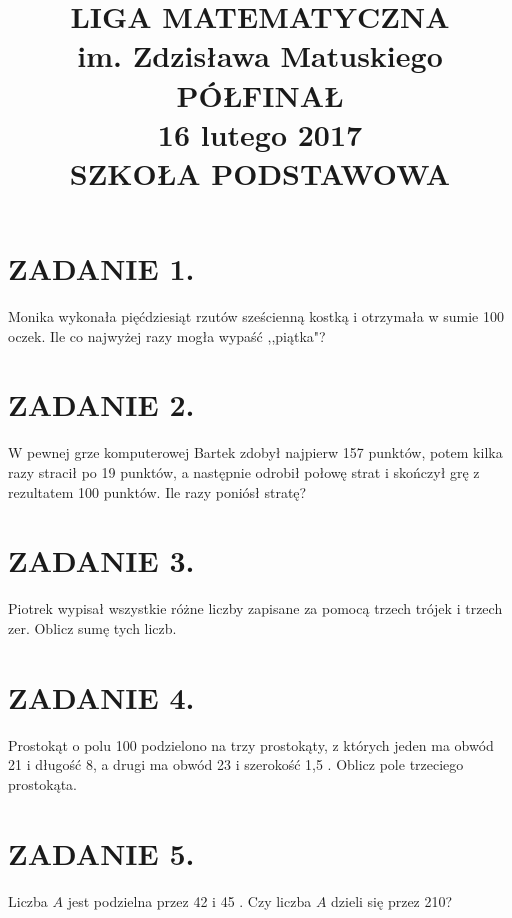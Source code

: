 \documentclass[10pt]{article}
\title{LIGA MATEMATYCZNA \\
 im. Zdzisława Matuskiego \\
 PÓŁFINAŁ \\
 16 lutego 2017 \\
 SZKOŁA PODSTAWOWA }
\author{}
\date{}
\begin{document}
\maketitle
\section*{ZADANIE 1.}
Monika wykonała pięćdziesiąt rzutów sześcienną kostką i otrzymała w sumie 100 oczek. Ile co najwyżej razy mogła wypaść ,,piątka"?

\section*{ZADANIE 2.}
W pewnej grze komputerowej Bartek zdobył najpierw 157 punktów, potem kilka razy stracił po 19 punktów, a następnie odrobił połowę strat i skończył grę z rezultatem 100 punktów. Ile razy poniósł stratę?

\section*{ZADANIE 3.}
Piotrek wypisał wszystkie różne liczby zapisane za pomocą trzech trójek i trzech zer. Oblicz sumę tych liczb.

\section*{ZADANIE 4.}
Prostokąt o polu 100 podzielono na trzy prostokąty, z których jeden ma obwód 21 i długość 8, a drugi ma obwód 23 i szerokość 1,5 . Oblicz pole trzeciego prostokąta.

\section*{ZADANIE 5.}
Liczba \(A\) jest podzielna przez 42 i 45 . Czy liczba \(A\) dzieli się przez 210?
\end{document}
